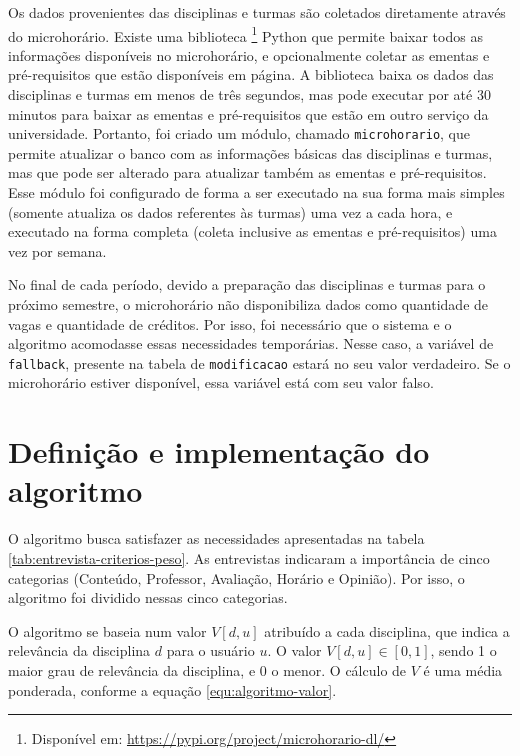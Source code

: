 

Os dados provenientes das disciplinas e turmas são coletados diretamente através do microhorário. Existe uma biblioteca  
\footnote{Dispon\'ivel em: \url{https://pypi.org/project/microhorario-dl/}}
Python \cite{site-python} que permite baixar todos as informações disponíveis no microhorário, e opcionalmente coletar as ementas e pré-requisitos que estão disponíveis em página. A biblioteca baixa os dados das disciplinas e turmas em menos de três segundos, mas pode executar por até 30 minutos para baixar as ementas e pré-requisitos que estão em outro serviço da universidade. Portanto, foi criado um módulo, chamado \verb|microhorario|, que permite atualizar o banco com as informações básicas das disciplinas e turmas, mas que pode ser alterado para atualizar também as ementas e pré-requisitos. Esse módulo foi configurado de forma a ser executado na sua forma mais simples (somente atualiza os dados referentes às turmas) uma vez a cada hora, e executado na forma completa (coleta inclusive as ementas e pré-requisitos) uma vez por semana.

No final de cada período, devido a preparação das disciplinas e turmas para o próximo semestre, o microhorário não disponibiliza dados como quantidade de vagas e quantidade de créditos. Por isso, foi necessário que o sistema e o algoritmo acomodasse essas necessidades temporárias. Nesse caso, a variável de \verb|fallback|, presente na tabela de \verb|modificacao| estará no seu valor verdadeiro. Se o microhorário estiver disponível, essa variável está com seu valor falso.

\section{Definição e implementação do algoritmo}
\label{sec:Definição e implementação do algoritmo}

O algoritmo busca satisfazer as necessidades apresentadas na tabela \ref{tab:entrevista-criterios-peso}. As entrevistas indicaram a importância de cinco categorias (Conteúdo, Professor, Avaliação, Horário e Opinião). Por isso, o algoritmo foi dividido nessas cinco categorias.

O algoritmo se baseia num valor $V[d,u]$ atribuído a cada disciplina, que indica a relevância da disciplina $d$ para o usuário $u$. O valor $V[d,u] \in [0, 1]$,
sendo 1 o maior grau de relevância da disciplina, e 0 o menor. O cálculo de $V$ é uma média ponderada, conforme a equação \ref{equ:algoritmo-valor}.

